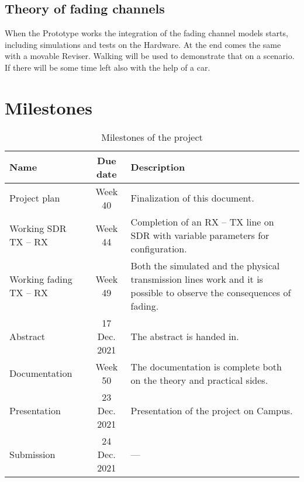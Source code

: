 \documentclass[a4paper, twosided, 11pt]{scrartcl}
\begin{document}
\subsection{Theory of fading channels}
When the Prototype works the integration of the fading channel models starts, including simulations and tests on the Hardware. 
At the end comes the same with a movable Reviser. Walking will be used to demonstrate that on a scenario. If there will be some time left also with the help of a car.

\clearpage

\section{Milestones}

\begin{table}[h]
	\centering
	\caption{Milestones of the project}
	\renewcommand\arraystretch{1.2}
	\begin{tabularx}{\linewidth}{l c X}
		\toprule
		\bfseries Name & \bfseries Due date & \bfseries Description \\
		\midrule
		Project plan & Week 40 & 
			Finalization of this document. \\

		Working SDR TX -- RX  & Week 44 &
			Completion of an RX -- TX line on SDR with variable parameters for configuration. \\

		Working fading TX -- RX & Week 49 &
			Both the simulated and the physical transmission lines work and it is possible to observe the consequences of fading.\\
			
		Abstract & 17 Dec. 2021 &
			The abstract is handed in. \\

		Documentation & Week 50 &
			The documentation is complete both on the theory and practical sides. \\

		Presentation & 23 Dec. 2021 &
			Presentation of the project on Campus. \\
		Submission & 24 Dec. 2021 & --- \\
		\bottomrule
	\end{tabularx}
\end{table}

\appendix
\end{document}
